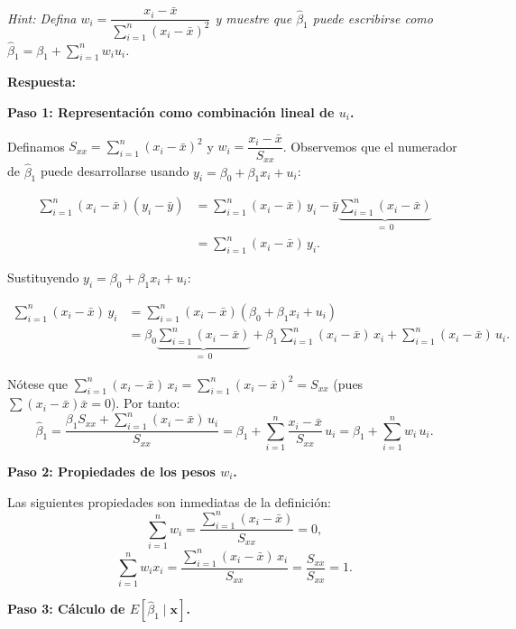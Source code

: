 \documentclass[10pt,a4paper]{article}
\begin{document}
\begin{enumerate}
\textit{Hint: Defina $w_i = \dfrac{x_i - \bar{x}}{\sum_{i=1}^n (x_i - \bar{x})^2}$ y muestre que $\hat{\beta}_1$ puede escribirse como $\hat{\beta}_1 = \beta_1 + \sum_{i=1}^n w_i u_i$.}

{\color{blue} \textbf{Respuesta:}

\medskip
\textbf{Paso 1: Representación como combinación lineal de $u_i$.}

Definamos $S_{xx} = \sum_{i=1}^n (x_i - \bar{x})^2$ y $w_i = \dfrac{x_i - \bar{x}}{S_{xx}}$.
Observemos que el numerador de $\hat{\beta}_1$ puede desarrollarse usando $y_i = \beta_0 + \beta_1 x_i + u_i$:

\begin{align*}
\sum_{i=1}^n (x_i - \bar{x})(y_i - \bar{y})
&= \sum_{i=1}^n (x_i - \bar{x})\,y_i - \bar{y}\underbrace{\sum_{i=1}^n (x_i - \bar{x})}_{=\,0} \\
&= \sum_{i=1}^n (x_i - \bar{x})\,y_i.
\end{align*}

Sustituyendo $y_i = \beta_0 + \beta_1 x_i + u_i$:

\begin{align*}
\sum_{i=1}^n (x_i - \bar{x})\,y_i
&= \sum_{i=1}^n (x_i - \bar{x})(\beta_0 + \beta_1 x_i + u_i) \\
&= \beta_0\underbrace{\sum_{i=1}^n (x_i - \bar{x})}_{=\,0}
  + \beta_1 \sum_{i=1}^n (x_i - \bar{x})\,x_i
  + \sum_{i=1}^n (x_i - \bar{x})\,u_i.
\end{align*}

Nótese que $\sum_{i=1}^n (x_i-\bar{x})\,x_i = \sum_{i=1}^n (x_i-\bar{x})^2 = S_{xx}$ (pues
$\sum(x_i-\bar{x})\bar{x}=0$). Por tanto:
$$\hat{\beta}_1
= \frac{\beta_1 S_{xx} + \sum_{i=1}^n (x_i - \bar{x})\,u_i}{S_{xx}}
= \beta_1 + \sum_{i=1}^n \frac{x_i - \bar{x}}{S_{xx}}\,u_i
= \beta_1 + \sum_{i=1}^n w_i\,u_i.$$

\medskip
\textbf{Paso 2: Propiedades de los pesos $w_i$.}

Las siguientes propiedades son inmediatas de la definición:
\begin{equation}\label{eq:sum_w}
\sum_{i=1}^n w_i = \frac{\sum_{i=1}^n (x_i - \bar{x})}{S_{xx}} = 0,
\end{equation}
\begin{equation}\label{eq:sum_wx}
\sum_{i=1}^n w_i x_i = \frac{\sum_{i=1}^n (x_i - \bar{x})\,x_i}{S_{xx}} = \frac{S_{xx}}{S_{xx}} = 1.
\end{equation}

\medskip
\textbf{Paso 3: Cálculo de $E[\hat{\beta}_1 \mid \mathbf{x}]$.}

}
\end{enumerate}
\end{document}
